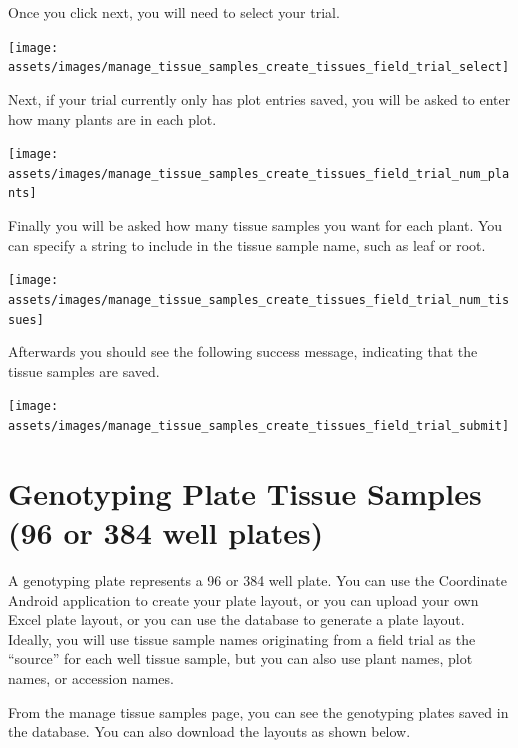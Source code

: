 \documentclass[
  12pt,
]{book}
\begin{document}
Once you click next, you will need to select your trial.

\begin{center}\texttt{[image: assets/images/manage\_tissue\_samples\_create\_tissues\_field\_trial\_select]} \end{center}

Next, if your trial currently only has plot entries saved, you will be asked to enter how many plants are in each plot.

\begin{center}\texttt{[image: assets/images/manage\_tissue\_samples\_create\_tissues\_field\_trial\_num\_plants]} \end{center}

Finally you will be asked how many tissue samples you want for each plant. You can specify a string to include in the tissue sample name, such as leaf or root.

\begin{center}\texttt{[image: assets/images/manage\_tissue\_samples\_create\_tissues\_field\_trial\_num\_tissues]} \end{center}

Afterwards you should see the following success message, indicating that the tissue samples are saved.

\begin{center}\texttt{[image: assets/images/manage\_tissue\_samples\_create\_tissues\_field\_trial\_submit]} \end{center}

\hypertarget{genotyping-plate-tissue-samples-96-or-384-well-plates}{%
\section{Genotyping Plate Tissue Samples (96 or 384 well plates)}\label{genotyping-plate-tissue-samples-96-or-384-well-plates}}

A genotyping plate represents a 96 or 384 well plate. You can use the Coordinate Android application to create your plate layout, or you can upload your own Excel plate layout, or you can use the database to generate a plate layout. Ideally, you will use tissue sample names originating from a field trial as the ``source'' for each well tissue sample, but you can also use plant names, plot names, or accession names.

From the manage tissue samples page, you can see the genotyping plates saved in the database. You can also download the layouts as shown below.
\end{document}
